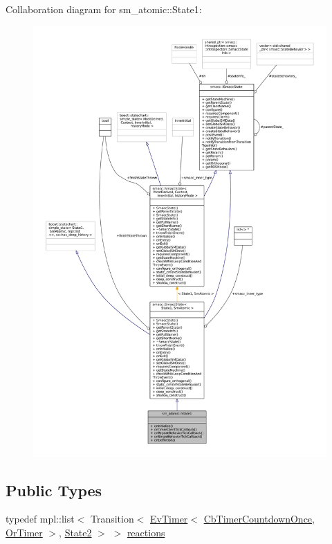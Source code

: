 Collaboration diagram for sm\+\_\+atomic\+:\+:State1\+:
\nopagebreak
\begin{figure}[H]
\begin{center}
\leavevmode
\includegraphics[width=350pt]{structsm__atomic_1_1State1__coll__graph}
\end{center}
\end{figure}
\subsection*{Public Types}
\begin{DoxyCompactItemize}
\item 
typedef mpl\+::list$<$ Transition$<$ \hyperlink{structros__timer__client_1_1EvTimer}{Ev\+Timer}$<$ \hyperlink{classros__timer__client_1_1CbTimerCountdownOnce}{Cb\+Timer\+Countdown\+Once}, \hyperlink{classsm__atomic_1_1OrTimer}{Or\+Timer} $>$, \hyperlink{structsm__atomic_1_1State2}{State2} $>$ $>$ \hyperlink{structsm__atomic_1_1State1_a38f44b3dfc4a7d81d4d2b7aca81171af}{reactions}
\end{DoxyCompactItemize}
